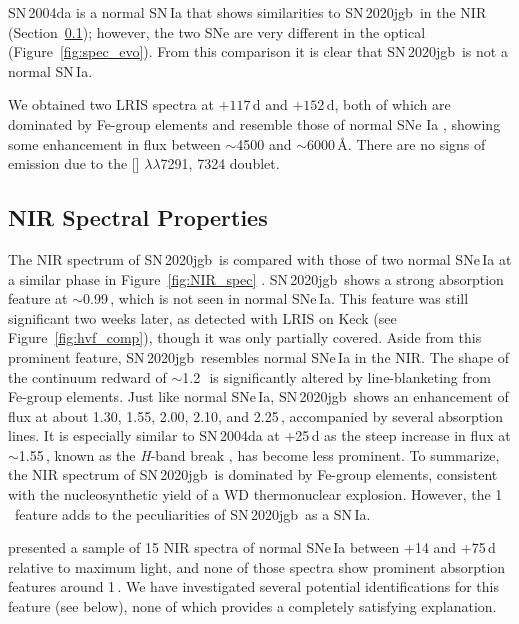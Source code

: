\documentclass[twocolumn]{aastex631}
\newcommand{\sn}{SN\,2020jgb}
\begin{document}
SN\,2004da is a normal SN\,Ia that shows similarities to \sn\ in the NIR (Section~\ref{sec:NIR_spec}); however, the two SNe are very different in the optical (Figure~\ref{fig:spec_evo}). From this comparison it is clear that \sn\ is not a normal SN\,Ia. 

We obtained two LRIS spectra at $+117$\,d and $+152$\,d, both of which are dominated by Fe-group elements and resemble those of normal SNe Ia \citep[e.g., SN\,2011fe;][]{Mazzali_2015}, showing some enhancement in flux between $\sim$4500 and $\sim$6000\,\AA. There are no signs of emission due to the [] $\lambda\lambda$7291, 7324 doublet.

\subsection{NIR Spectral Properties}
\label{sec:NIR_spec}
The NIR spectrum of \sn\ is compared with those of two normal SNe\,Ia at a similar phase in Figure~\ref{fig:NIR_spec} \citep[data for SN\,2004ab and SN\,2004da from][]{Marion2009_NIR}. \sn\ shows a strong absorption feature at $\sim$0.99\,\micron, which is not seen in normal SNe\,Ia. This feature was still significant two weeks later, as detected with LRIS on Keck (see Figure~\ref{fig:hvf_comp}), though it was only partially covered. Aside from this prominent feature, \sn\ resembles normal SNe\,Ia in the NIR. The shape of the continuum redward of $\sim$1.2\,\micron\ is significantly altered by line-blanketing from Fe-group elements. Just like normal SNe\,Ia, \sn\ shows an enhancement of flux at about 1.30, 1.55, 2.00, 2.10, and 2.25\,\micron, accompanied by several  absorption lines. It is especially similar to SN\,2004da at +25\,d as the steep increase in flux at $\sim$1.55\,\micron, known as the \textit{H}-band break \citep{Hsiao_CSP_2019}, has become less prominent. To summarize, the NIR spectrum of \sn\ is dominated by Fe-group elements, consistent with the nucleosynthetic yield of a WD thermonuclear explosion. However, the  1\,\micron\ feature adds to the peculiarities of \sn\ as a SN\,Ia.

\citet{Marion2009_NIR} presented a sample of 15 NIR spectra of normal SNe\,Ia between +14 and +75\,d relative to maximum light, and none of those spectra show prominent absorption features around 1\,\micron. We have investigated several potential identifications for this feature (see below), none of which provides a completely satisfying explanation.
\end{document}
